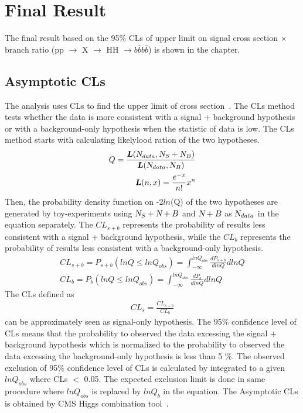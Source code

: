 \chapter{Final Result} \label{chap:6}

The final result based on the 95$\% $ CLs of upper limit on signal cross section $\times $ branch ratio (pp $\rightarrow$ X $\rightarrow$ HH $\rightarrow b\bar{b}b\bar{b}$) is shown in the chapter.

\section{Asymptotic CLs} 
The analysis uses CLs to find the upper limit of cross section~\citep{0954-3899-28-10-313,NicolasChanon}. The CLs method tests whether the data is more consistent with a signal + background hypothesis or with a background-only hypothesis when the statistic of data is low. The CLs method starts with calculating likelylood ration of the two hypotheses. 
\begin{equation} 
\begin{split}
Q = \frac{\textbf{\textsl{L}}(\textsl{N}_{data},\textsl{N}_{S}+\textsl{N}_{B})}{\textbf{\textsl{L}}(\textsl{N}_{data},\textsl{N}_{B})}\\
\textbf{\textsl{L}}(n,x) = \frac{e^{-x}}{n!}x^n
\end{split}
\end{equation}
Then, the probability density function on -2$\textit{ln}$(Q) of the two hypotheses are generated by toy-experiments using $\textsl{N}_{S} + \textsl{N}+{B}$ and $\textsl{N}+{B}$ as $\textsl{N}_{data}$ in the equation separately. The $CL_{s+b}$ represents the probability of results less consistent with a signal + background hypothesis, while the $CL_{b}$ represents the probability of results less consistent with a background-only hypothesis.
\begin{equation}
\begin{split}
CL_{s+b} = P_{s+b}(lnQ \leq lnQ_{obs}) = \int^{lnQ_{obs}}_{-\infty} \frac{dP_{s+b}}{dlnQ} dlnQ \\
CL_{b} = P_{b}(lnQ \leq lnQ_{obs}) = \int^{lnQ_{obs}}_{-\infty} \frac{dP_{b}}{dlnQ} dlnQ
\end{split}
\end{equation}
The CLs defined as 
\begin{equation} 
\begin{split}
CL_{s} = \frac{CL_{s+b}}{CL_{b}}
\end{split}
\end{equation}
can be approximately seen as signal-only hypothesis. The 95$\% $ confidence level of CLs means that the probability to observed the data excessing the signal + background hypothesis which is normalized to the probability to observed the data excessing the background-only hypothesis is less than 5 $\% $. The observed  exclusion of 95$\% $ confidence level of CLs is calculated by integrated to a given $lnQ_{obs}$ where CLs $<$ 0.05. The expected exclusion limit is done in same procedure where $lnQ_{obs}$ is replaced by $lnQ_{b}$ in the equation. The Asymptotic CLs is obtained by CMS Higgs combination tool~\citep{higgsCombine}.

